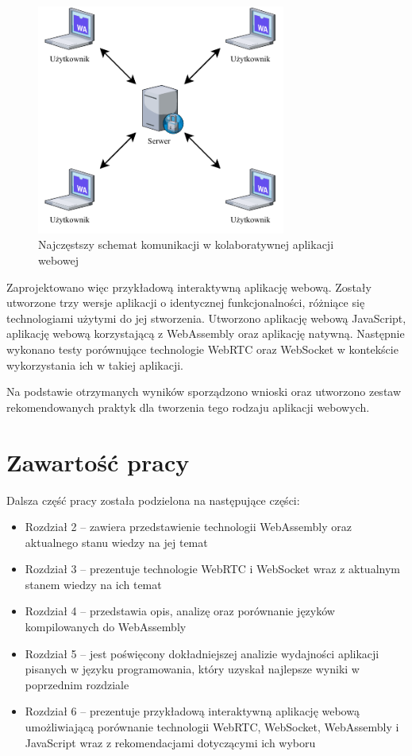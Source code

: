 \documentclass[language=polish,type=master]{aghmodern}
\begin{document}
\begin{figure}[H]
    \centering
    \vspace*{15pt}
    \includegraphics[width=0.72809\textwidth]{images/collaboration.pdf}
    \caption{Najczęstszy schemat komunikacji w kolaboratywnej aplikacji webowej}
    \label{fig:collaboration}
\end{figure}

Zaprojektowano więc przykładową interaktywną aplikację webową.
Zostały utworzone trzy wersje aplikacji o identycznej funkcjonalności, różniące się technologiami użytymi do jej stworzenia.
Utworzono aplikację webową JavaScript, aplikację webową korzystającą z WebAssembly oraz aplikację natywną.
Następnie wykonano testy porównujące technologie WebRTC oraz WebSocket w kontekście wykorzystania ich w takiej aplikacji.

 Na podstawie otrzymanych wyników sporządzono wnioski oraz utworzono zestaw rekomendowanych praktyk dla tworzenia tego rodzaju aplikacji webowych.

\clearpage

\section{Zawartość pracy}
Dalsza część pracy została podzielona na następujące części:

\begin{itemize}
    \item Rozdział 2 -- zawiera przedstawienie technologii WebAssembly oraz aktualnego stanu wiedzy na jej temat
    \item Rozdział 3 -- prezentuje technologie WebRTC i WebSocket wraz z aktualnym stanem wiedzy na ich temat
    \item Rozdział 4 -- przedstawia opis, analizę oraz porównanie języków kompilowanych do WebAssembly
    \item Rozdział 5 -- jest poświęcony dokładniejszej analizie wydajności aplikacji pisanych w języku programowania, który uzyskał najlepsze wyniki w poprzednim rozdziale
    \item Rozdział 6 -- prezentuje przykładową interaktywną aplikację webową umożliwiającą porównanie technologii WebRTC, WebSocket, WebAssembly i JavaScript wraz z rekomendacjami dotyczącymi ich wyboru
\end{itemize}
\end{document}

